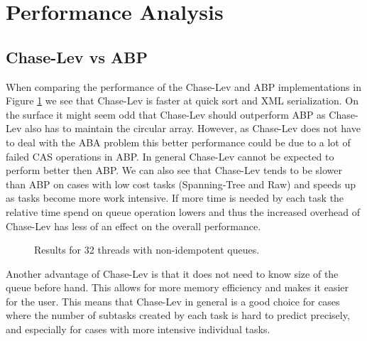 \section{Performance Analysis}
\label{sec:performance_analysis}
\subsection{Chase-Lev vs ABP}
When comparing the performance of the Chase-Lev and ABP implementations in Figure \ref{fig:32nonidem} we see that Chase-Lev is faster at quick sort and XML serialization. On the surface it might seem odd that Chase-Lev should outperform ABP as Chase-Lev also has to maintain the circular array. However, as Chase-Lev does not have to deal with the ABA problem this better performance could be due to a lot of failed CAS operations in ABP\@. In general Chase-Lev cannot be expected to perform better then ABP\@. We can also see that Chase-Lev tends to be slower than ABP on cases with low cost tasks (Spanning-Tree and Raw) and speeds up as tasks become more work intensive. If more time is needed by each task the relative time spend on queue operation lowers and thus the increased overhead of Chase-Lev has less of an effect on the overall performance.

\begin{figure}
\caption{Results for 32 threads with non-idempotent queues.}
\label{fig:32nonidem}
\end{figure}

Another advantage of Chase-Lev is that it does not need to know size of the queue before hand. This allows for more memory efficiency and makes it easier for the user. This means that Chase-Lev in general is a good choice for cases where the number of subtasks created by each task is hard to predict precisely, and especially for cases with more intensive individual tasks.

